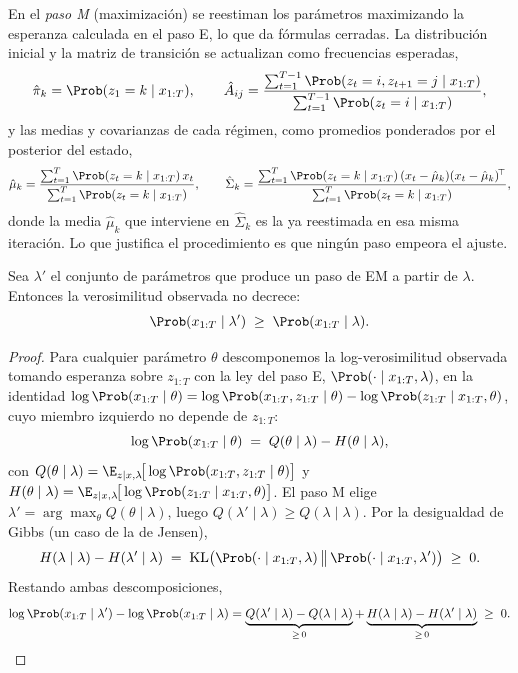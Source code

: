 En el \emph{paso M} (maximización) se reestiman los parámetros maximizando la esperanza calculada en el paso E, lo que da fórmulas cerradas. La distribución inicial y la matriz de transición se actualizan como frecuencias esperadas,
\[
\hat{\pi}_k = \Prob(z_1 = k \mid x_{1:T}),
\qquad
\hat{A}_{ij} = \frac{\sum_{t=1}^{T-1} \Prob(z_t = i, z_{t+1} = j \mid x_{1:T})}{\sum_{t=1}^{T-1} \Prob(z_t = i \mid x_{1:T})},
\]
y las medias y covarianzas de cada régimen, como promedios ponderados por el posterior del estado,
\[
\hat{\mu}_k = \frac{\sum_{t=1}^{T} \Prob(z_t = k \mid x_{1:T})\, x_t}{\sum_{t=1}^{T} \Prob(z_t = k \mid x_{1:T})},
\qquad
\hat{\Sigma}_k = \frac{\sum_{t=1}^{T} \Prob(z_t = k \mid x_{1:T})\, (x_t - \hat{\mu}_k)(x_t - \hat{\mu}_k)^{\!\top}}{\sum_{t=1}^{T} \Prob(z_t = k \mid x_{1:T})},
\]
donde la media $\hat{\mu}_k$ que interviene en $\hat{\Sigma}_k$ es la ya reestimada en esa misma iteración. Lo que justifica el procedimiento es que ningún paso empeora el ajuste.

\begin{lema}[Monotonía de EM]
\label{lem:em}
Sea $\lambda'$ el conjunto de parámetros que produce un paso de EM a partir de $\lambda$. Entonces la verosimilitud observada no decrece:
\[
\Prob(x_{1:T} \mid \lambda') \;\ge\; \Prob(x_{1:T} \mid \lambda).
\]
\end{lema}

\begin{proof}
Para cualquier parámetro $\theta$ descomponemos la log-verosimilitud observada tomando esperanza sobre $z_{1:T}$ con la ley del paso E, $\Prob(\cdot \mid x_{1:T}, \lambda)$, en la identidad $\log\Prob(x_{1:T}\mid\theta) = \log\Prob(x_{1:T}, z_{1:T}\mid\theta) - \log\Prob(z_{1:T}\mid x_{1:T}, \theta)$, cuyo miembro izquierdo no depende de $z_{1:T}$:
\[
\log\Prob(x_{1:T} \mid \theta) \;=\; Q(\theta \mid \lambda) - H(\theta \mid \lambda),
\]
con $Q(\theta\mid\lambda) = \E_{z\mid x,\lambda}\!\big[\log\Prob(x_{1:T}, z_{1:T}\mid\theta)\big]$ y $H(\theta\mid\lambda) = \E_{z\mid x,\lambda}\!\big[\log\Prob(z_{1:T}\mid x_{1:T},\theta)\big]$. El paso M elige $\lambda' = \arg\max_{\theta} Q(\theta\mid\lambda)$, luego $Q(\lambda'\mid\lambda) \ge Q(\lambda\mid\lambda)$. Por la desigualdad de Gibbs (un caso de la de Jensen),
\[
H(\lambda\mid\lambda) - H(\lambda'\mid\lambda) \;=\; \mathrm{KL}\big(\Prob(\cdot\mid x_{1:T},\lambda)\,\big\|\,\Prob(\cdot\mid x_{1:T},\lambda')\big) \;\ge\; 0.
\]
Restando ambas descomposiciones,
\[
\log\Prob(x_{1:T}\mid\lambda') - \log\Prob(x_{1:T}\mid\lambda)
= \underbrace{Q(\lambda'\mid\lambda) - Q(\lambda\mid\lambda)}_{\ge\, 0}
+ \underbrace{H(\lambda\mid\lambda) - H(\lambda'\mid\lambda)}_{\ge\, 0} \;\ge\; 0. \qedhere
\]
\end{proof}

